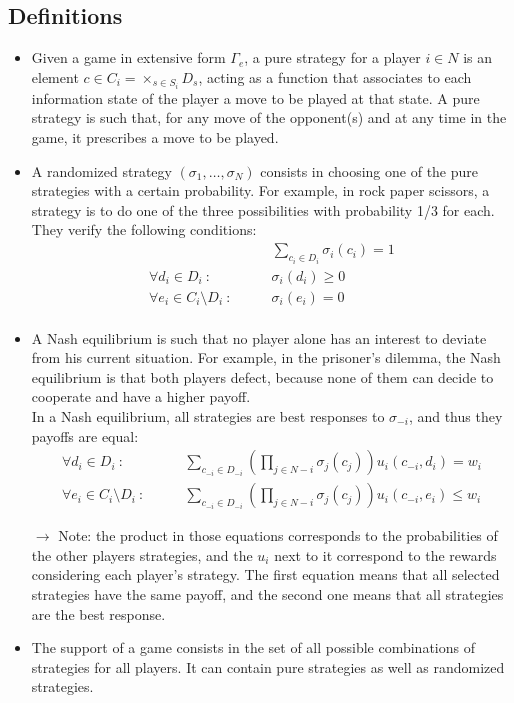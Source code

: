 \documentclass[12pt, openany]{report}
\theoremstyle{definition}
\begin{document}
\subsection{Definitions}
\begin{itemize}
	\item Given a game in extensive form $\Gamma_e$, a pure strategy for a player $i\in N$ is an element $c\in C_i = \times_{s\in S_i}D_s$, acting as a function that associates to each information state of the player a move to be played at that state. A pure strategy is such that, for any move of the opponent(s) and at any time in the game, it prescribes a move to be played.
	\item A randomized strategy $(\sigma_1,\dots, \sigma_N)$ consists in choosing one of the pure strategies with a certain probability. For example, in rock paper scissors, a strategy is to do one of the three possibilities with probability 1/3 for each.\\
	They verify the following conditions:
	\begin{equation}
		\begin{aligned}
			&\sum_{c_i\in D_i}\sigma_i(c_i)=1\\
			\forall d_i\in D_i\ :\qquad &\sigma_i(d_i)\ge 0\\
			\forall e_i\in C_i\setminus D_i\ : \qquad &\sigma_i(e_i)=0\\
		\end{aligned}
	\end{equation}
	\item A Nash equilibrium is such that no player alone has an interest to deviate from his current situation. For example, in the prisoner's dilemma, the Nash equilibrium is that both players defect, because none of them can decide to cooperate and have a higher payoff.\\
	In a Nash equilibrium, all strategies are best responses to $\sigma_{-i}$, and thus they payoffs are equal:
	\begin{equation}
		\begin{aligned}
			\forall d_i\in D_i\ : \qquad &\sum_{c_{-i}\in D_{-i}} \left(\prod_{j\in N-i}\sigma_j(c_j)\right) u_i(c_{-i},d_i)=w_i\\
			\forall e_i\in C_i\setminus D_i\ : \qquad &\sum_{c_{-i}\in D_{-i}} \left(\prod_{j\in N-i}\sigma_j(c_j)\right) u_i(c_{-i},e_i)\le w_i
		\end{aligned}
	\end{equation}
	\item [$\to$] Note: the product in those equations corresponds to the probabilities of the other players strategies, and the $u_i$ next to it correspond to the rewards considering each player's strategy. The first equation means that all selected strategies have the same payoff, and the second one means that all strategies are the best response. 
	\item The support of a game consists in the set of all possible combinations of strategies for all players. It can contain pure strategies as well as randomized strategies. 
\end{itemize}
\end{document}
